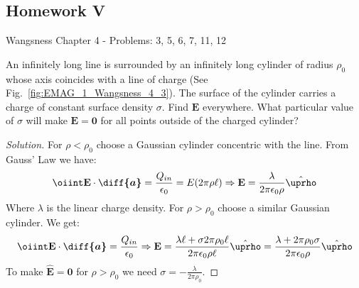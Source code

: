         \subsection{Homework V}
            Wangsness Chapter 4 - Problems: 3, 5, 6, 7, 11, 12
            \begin{problem}[Wangsness 4-3]
                \label{problem:EMAG_wangsness_4_3}
                An infinitely long line is surrounded by an infinitely
                long cylinder of radius $\rho_{0}$ whose axis coincides
                with a line of charge
                (See Fig.~\ref{fig:EMAG_1_Wangsness_4_3}). The surface
                of the  cylinder carries a charge of constant surface
                density $\sigma$. Find $\mathbf{E}$ everywhere. What
                particular value of $\sigma$ will make
                $\mathbf{E}=\mathbf{0}$
                for all points outside of the charged cylinder?
            \end{problem}
            \begin{proof}[Solution]
                For $\rho<\rho_0$ choose a Gaussian cylinder concentric
                with the line. From Gauss' Law we have:
                \begin{equation*}
                    \oiint\mathbf{E}\cdot\boldsymbol{\diff{a}}
                    =\frac{Q_{in}}{\epsilon_0}
                    =E(2\pi\rho\ell)\Rightarrow
                    \mathbf{E}
                    =\frac{\lambda}{2\pi\epsilon_{0}\rho}
                    \hat{\boldsymbol{\uprho}}
                \end{equation*}
                Where $\lambda$ is the linear charge density.
                For $\rho>\rho_{0}$ choose a similar
                Gaussian cylinder. We get:
                \begin{equation*}
                    \oiint\mathbf{E}\cdot\boldsymbol{\diff{a}}
                    =\frac{Q_{in}}{\epsilon_{0}}
                    \Rightarrow\mathbf{E}
                    =\frac{\lambda\ell+\sigma 2\pi\rho_{0}\ell}
                    {2\pi\epsilon_{0}\rho\ell}\hat{\boldsymbol{\uprho}}
                    =\frac{\lambda+2\pi\rho_{0}\sigma}
                          {2\pi\epsilon_{0}\rho}
                    \hat{\boldsymbol{\uprho}}
                \end{equation*}
                To make $\hat{\mathbf{E}}=\mathbf{0}$
                for $\rho>\rho_{0}$ we need
                $\sigma=-\frac{\lambda}{2\pi\rho_{0}}$.
            \end{proof}
